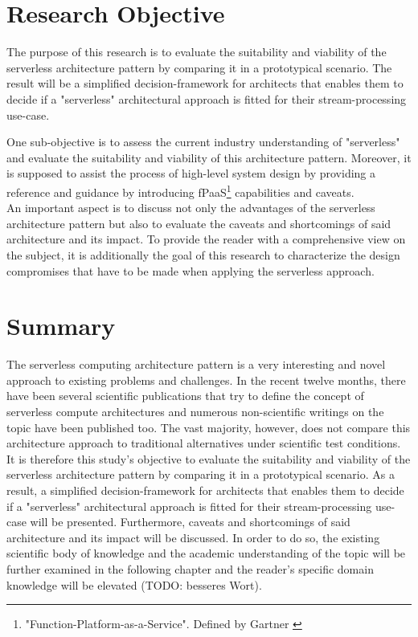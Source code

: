 \section{Research Objective}

The purpose of this research is to evaluate the suitability and viability of the serverless architecture pattern by comparing it in a prototypical scenario. The result will be a simplified decision-framework for architects that enables them to decide if a "serverless" architectural approach is fitted for their stream-processing use-case.

One sub-objective is to assess the current industry understanding of "serverless" and evaluate the suitability and viability of this architecture pattern.
Moreover, it is supposed to assist the process of high-level system design by providing a reference and guidance by introducing fPaaS\footnote{"Function-Platform-as-a-Service". Defined by Gartner \autocite{Chandrasekaran2017EvolutionWhen}} capabilities and caveats.\\
An important aspect is to discuss not only the advantages of the serverless architecture pattern but also to evaluate the caveats and shortcomings of said architecture and its impact. To provide the reader with a comprehensive view on the subject, it is additionally the goal of this research to characterize the design compromises that have to be made when applying the serverless approach.  

\section{Summary}

The serverless computing architecture pattern is a very interesting and novel approach to existing problems and challenges. In the recent twelve months, there have been several scientific publications that try to define the concept of serverless compute architectures and numerous non-scientific writings on the topic have been published too. The vast majority, however, does not compare this architecture approach to traditional alternatives under scientific test conditions. \\
It is therefore this study's objective to evaluate the suitability and viability of the serverless architecture pattern by comparing it in a prototypical scenario. As a result, a simplified decision-framework for architects that enables them to decide if a "serverless" architectural approach is fitted for their stream-processing use-case will be presented. Furthermore, caveats and shortcomings of said architecture and its impact will be discussed. 
In order to do so, the existing scientific body of knowledge and the academic understanding of the topic will be further examined in the following chapter and the reader's specific domain knowledge will be elevated (TODO: besseres Wort). 
